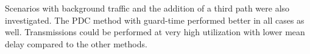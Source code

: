 \documentclass[letterpaper,10pt,oneside,conference,final]{sbrt2015}
\begin{document}
Scenarios with background traffic and the addition of a third path were also investigated. The PDC method with guard-time performed better in all cases as well. Transmissions could be performed at very high utilization with lower mean delay compared to the other methods.





\end{document}
